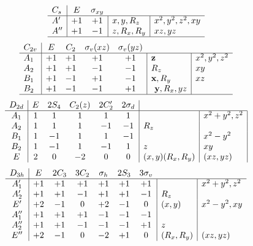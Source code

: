 
\[
\begin{array}{l|cc|l|l}
 C_{s}  & E & \multicolumn{1}{c}{\sigma_{xy}} &  \multicolumn{1}{c}{} & \\
\hline
 A' & +1 & +1 &  x, y, R_z & x^{2}, y^{2}, z^{2}, xy \\
 A'' & +1 & -1 &  z, R_x, R_y & xz, yz \\
 \hline
 \end{array}
\]
\[
\begin{array}{l|cccc|l|l}
 C_{2v}  & E & C_2 & \multicolumn{1}{c}{\sigma_{v} (xz)}  & \multicolumn{1}{c}{\sigma_{v} (yz)} &  \multicolumn{1}{c}{}  & \\
\hline
 A_{1} & +1  & +1  & +1  & +1  & \textbf{z} & x^{2}, y^{2}, z^{2} \\
 A_{2} & +1  & +1  & -1  & -1  & R_{z} & xy \\
 B_{1} & +1  & -1  & +1  & -1  & \textbf{x}, R_y & xz \\
 B_{2} & +1  & -1  & -1  & +1  &\textbf{ y}, R_x, yz \\
 \hline
\end{array}
\]
\[
\begin{array}{c|ccccc|l|l|l}
D_{2d} & E & 2S_4 & C_2(z) & 2C'_2 &2\sigma_d & \multicolumn{1}{c} {\;} & \multicolumn{1}{c}{}  \\
\hline
A_1&	1&	1&	1&	1&	1&		&x^2+y^2, z^2 \\
A_2&	1&	1&	1&	-1&	-1&	R_z	& \\
B_1&	1&	-1&	1&	1&	-1&		&x^2-y^2 \\
B_2&	1&	-1&	1&	-1&	1&	z	&xy \\
E&	2&	0&	-2&	0&	0&	(x, y) (R_x, R_y)&	(xz, yz)\\
\end{array}
\]
\[
\begin{array}{c|cccccc|l|l}
D_{3h} & E & 2C_3 & 3C_2 & \sigma_h & 2S_3 & \multicolumn{1}{c}{3\sigma_v} & \multicolumn{1}{c}{} & \\
\hline
A'_1 & +1  &  +1  &  +1  &  +1  &  +1  &  +1  &     & x^2+y^2,z^2 \\
A'_2 & +1  &  +1  & -1  &  +1  &  +1  & -1  & R_z & \\
E'     & +2 & -1  &  0 &  +2 & -1  &   0 &  (x, y) & x^2-y^2, xy \\
A''_1& +1  &  +1  &  +1  & -1  & -1  & -1  & & \\
A''_2& +1  &  +1  & -1  & -1  & -1  &  +1  &  z & \\
E''    & +2 & -1  &  0 & -2 &  +1  &  0 &  (R_x, R_y) & (xz, yz) \\
\end{array}
\]
